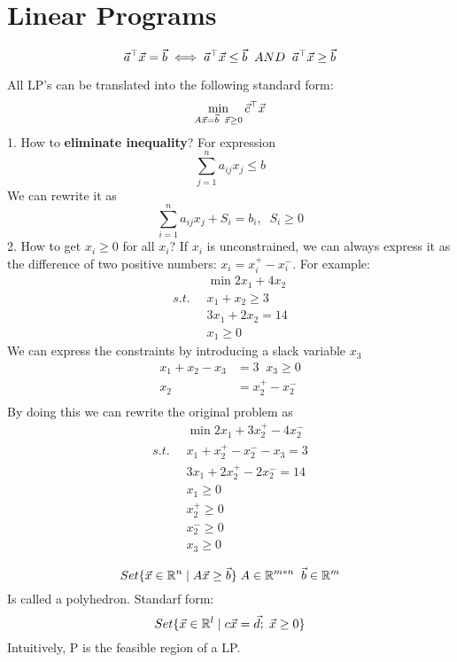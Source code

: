 \section{Linear Programs} %
\label{sec:linear_programs}

\begin{remark}
		\[
\vec{a}^\top\vec{x} = \vec{b} \iff \vec{a}^\top\vec{x} \le \vec{b} \;\;AND\;\; \vec{a}^\top\vec{x} \ge \vec{b}
	\]
\end{remark}

\begin{theorem}
	All LP's can be translated into the following standard form:
	\[
\min_{A\vec{x} = \vec{b}\;\;\vec{x}\ge 0} \vec{c}^\top\vec{x}
	\]
	1. How to \textbf{eliminate inequality}? For expression
	\[
\sum_{j=1}^na_{ij}x_j \le b
	\]
	We can rewrite it as
	\[
\sum_{i=1}^na_{ij}x_j+S_i=b_i, \;\; S_i \ge 0
	\]
	2. How to get $x_i\ge0$ for all $x_i$? If $x_i$ is unconstrained, we can always express it as the difference of two positive numbers: $x_i = x_i^+-x_i^-$. For example:
	\begin{align*}
		&\min2x_1+4x_2\\
		s.t.\;\;&x_1+x_2\ge3\\
		&3x_1+2x_2=14\\
		&x_1\ge0
	\end{align*}
	We can express the constraints by introducing a slack variable $x_3$\begin{align*}
		x_1+x_2-x_3&=3\;\;x_3\ge0\\
		x_2&=x_2^+-x_2^-\\
	\end{align*}
	By doing this we can rewrite the original problem as
	\begin{align*}
		&\min2x_1+3x_2^+-4x_2^-\\
		s.t.\;\;&x_1+x_2^+-x_2^--x_3 = 3\\
		&3x_1+2x_2^+-2x_2^- = 14\\
		&x_1\ge0\\
		&x_2^+\ge0\\
		&x_2^-\ge0\\
		&x_3\ge0
	\end{align*}
\end{theorem}

\begin{definition}[Polyhedron]
\[
Set \{\vec{x}\in\mathbb{R}^n \;|\; A\vec{x} \ge \vec{b}\} \;A\in\mathbb{R}^{m*n}\;\;\vec{b}\in\mathbb{R}^m
\]
Is called a polyhedron. Standarf form:
\[
Set\{\vec{x}\in\mathbb{R}^l \;|\;c\vec{x}=\vec{d};\;\vec{x}\ge0 \}
\]
Intuitively, P is the feasible region of a LP.
\end{definition}

